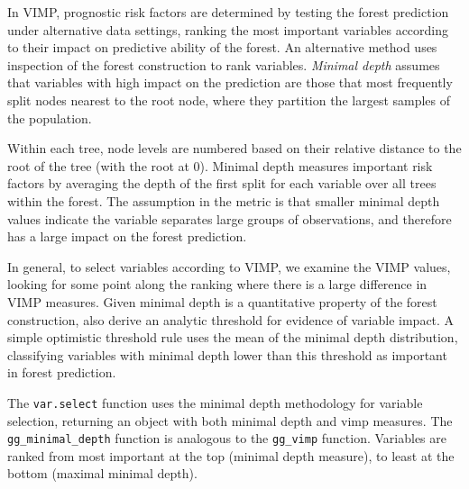 \documentclass[article]{jss}
\begin{document}
In VIMP, prognostic risk factors are determined by testing the forest
prediction under alternative data settings, ranking the most important
variables according to their impact on predictive ability of the forest.
An alternative method uses inspection of the forest construction to rank
variables. \emph{Minimal depth} \citep{Ishwaran:2010, Ishwaran:2011}
assumes that variables with high impact on the prediction are those that
most frequently split nodes nearest to the root node, where they
partition the largest samples of the population.

Within each tree, node levels are numbered based on their relative
distance to the root of the tree (with the root at 0). Minimal depth
measures important risk factors by averaging the depth of the first
split for each variable over all trees within the forest. The assumption
in the metric is that smaller minimal depth values indicate the variable
separates large groups of observations, and therefore has a large impact
on the forest prediction.

In general, to select variables according to VIMP, we examine the VIMP
values, looking for some point along the ranking where there is a large
difference in VIMP measures. Given minimal depth is a quantitative
property of the forest construction, \cite{Ishwaran:2010} also derive an
analytic threshold for evidence of variable impact. A simple optimistic
threshold rule uses the mean of the minimal depth distribution,
classifying variables with minimal depth lower than this threshold as
important in forest prediction.

The  \texttt{var.select} function uses the minimal
depth methodology for variable selection, returning an object with both
minimal depth and vimp measures. The 
\texttt{gg\_minimal\_depth} function is analogous to the
\texttt{gg\_vimp} function. Variables are ranked from most important at
the top (minimal depth measure), to least at the bottom (maximal minimal
depth).
\end{document}
